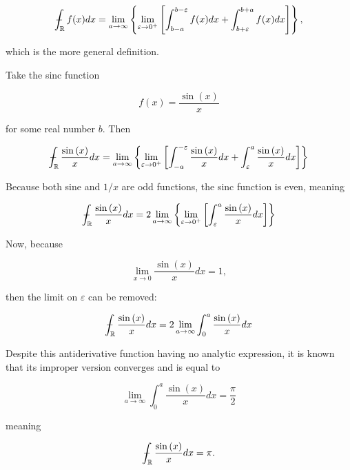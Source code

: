 \begin{equation} \dashint_{\mathbb{R}} f(x)dx = \lim\limits_{a\to\infty} \left\{ \lim\limits_{\varepsilon\to 0^+} \left[\int_{b-a}^{b-\varepsilon} f(x)dx + \int_{b+\varepsilon}^{b+a} f(x)dx \right] \right\}, \end{equation}

	\noindent which is the more general definition.

\begin{example} %
	Take the sinc function

\begin{equation} f\left(x\right) = \dfrac{\sin\left(x\right)}{x}\end{equation}

	\noindent for some real number $b$. Then

\begin{equation} \dashint_{\mathbb{R}} \dfrac{\sin\left(x\right)}{x}dx = \lim\limits_{a\to\infty} \left\{ \lim\limits_{\varepsilon\to 0^+} \left[\int_{-a}^{-\varepsilon} \dfrac{\sin\left(x\right)}{x}dx + \int_{\varepsilon}^{a} \dfrac{\sin\left(x\right)}{x}dx \right] \right\} \end{equation}

	Because both sine and $1/x$ are odd functions, the sinc function is even, meaning

\begin{equation} \dashint_{\mathbb{R}} \dfrac{\sin\left(x\right)}{x}dx = 2\lim\limits_{a\to\infty} \left\{ \lim\limits_{\varepsilon\to 0^+} \left[ \int_{\varepsilon}^{a} \dfrac{\sin\left(x\right)}{x}dx \right] \right\} \end{equation}

	Now, because

\begin{equation} \lim\limits_{x\to 0} \dfrac{\sin\left(x\right)}{x}dx = 1, \end{equation}

	\noindent then the limit on $\varepsilon$ can be removed:

\begin{equation} \dashint_{\mathbb{R}} \dfrac{\sin\left(x\right)}{x}dx = 2\lim\limits_{a\to\infty} \int_{0}^{a} \dfrac{\sin\left(x\right)}{x}dx  \end{equation}

	Despite this antiderivative function having no analytic expression, it is known that its improper version converges and is equal to

\begin{equation} \lim\limits_{a\to\infty} \int_{0}^{a} \dfrac{\sin\left(x\right)}{x}dx = \dfrac{\pi}{2} \end{equation}

	\noindent meaning

\begin{equation} \dashint_{\mathbb{R}} \dfrac{\sin\left(x\right)}{x}dx = \pi. \end{equation}

\examplebar
\end{example} %

